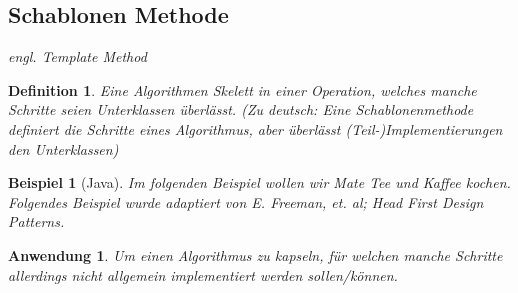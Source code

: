 \documentclass[a4paper]{article}
\theoremstyle{break}
\newtheorem{defi}{Definition}[section]
\newtheorem{ex}{Beispiel}[section]
\newtheorem{why}{Anwendung}[section]
\begin{document}
\newpage
\subsection{Schablonen Methode}

\textit{engl. Template Method}

\begin{defi}
	Eine Algorithmen Skelett in einer Operation, welches manche Schritte seien Unterklassen überlässt. (Zu deutsch: Eine Schablonenmethode definiert die Schritte eines Algorithmus, aber überlässt (Teil-)Implementierungen den Unterklassen)
\end{defi}

\begin{ex}[Java]
	Im folgenden Beispiel wollen wir Mate Tee und Kaffee kochen. Folgendes Beispiel wurde adaptiert von E. Freeman, et. al; Head First Design Patterns.
	
	
	
	
	
	
\end{ex}

\begin{why}
		Um einen Algorithmus zu kapseln, für welchen manche Schritte allerdings nicht allgemein implementiert werden sollen/können.	
\end{why}




	
\end{document}
